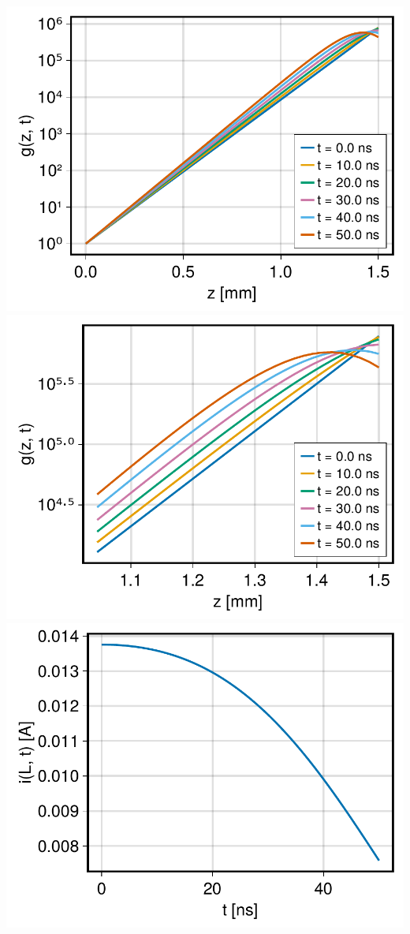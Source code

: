 \documentclass{beamer}
\begin{document}
\begin{frame}
\begin{minipage}{0.4\linewidth}
            \includegraphics[scale=0.225]{"g.pdf"}
            \includegraphics[scale=0.225]{"g_zoom.pdf"}
            \includegraphics[scale=0.225]{"oi.pdf"}
        \end{minipage}
    \end{frame}
\end{document}

